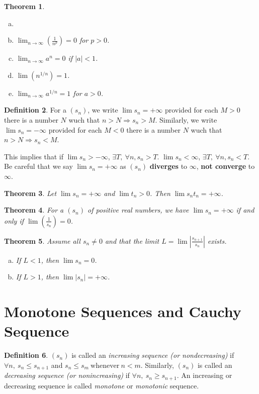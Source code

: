 \documentclass[12pt, lettersize]{book}
\theoremstyle{plain}
\newtheorem{thm}{Theorem}[section]
\theoremstyle{definition}
\newtheorem{dfn}[thm]{Definition}
\theoremstyle{remark}
\begin{document}
	\begin{thm}
		\begin{enumerate}[(a)]
			\item[]
			\item $\lim_{n\rightarrow\infty}(\frac{1}{n^p})=0$ for $p>0$.
			\item $\lim_{n\rightarrow\infty}a^n=0$ if $|a|<1$.
			\item $\lim(n^{1/n})=1$.
			\item $\lim_{n\rightarrow\infty}a^{1/n}=1$ for $a>0$.
		\end{enumerate}
	\end{thm}
	\newpage
	
	\begin{dfn}
		For a $(s_n)$, we write $\lim s_n=+\infty$ provided for each $M>0$ there is a number $N$ wuch that $n>N\Rightarrow s_n>M$. Similarly, we write $\lim s_n=-\infty$ provided for each $M<0$ there is a number $N$ wuch that $n>N\Rightarrow s_n<M$.
	\end{dfn}
	This implies that if $\lim s_n>-\infty$, $\exists T,\ \forall n, s_n>T$. $\lim s_n<\infty$, $\exists T,\ \forall n, s_n<T$. 
	Be careful that we say $\lim s_n=+\infty$ as $(s_n)$ \textbf{diverges} to $\infty$, \textbf{not converge} to $\infty$.
	
	\begin{thm}
		Let $\lim s_n=+\infty$ and $\lim t_n>0$. Then $\lim s_nt_n=+\infty$.
	\end{thm}
	
	\begin{thm}
		For a $(s_n)$ of \emph{positive} real numbers, we have $\lim s_n=+\infty$ if and only if $\lim(\frac{1}{s_n})=0$.
	\end{thm}
	
	\begin{thm}
		Assume all $s_n\neq0$ and that the limit $L=\lim\left|\frac{s_{n+1}}{s_n}\right|$ exists.
		\begin{enumerate}[(a)]
			\item If $L<1$, then $\lim s_n=0$.
			\item If $L>1$, then $\lim |s_n|=+\infty$.
		\end{enumerate} 
	\end{thm}
	
	\newpage
	\section{Monotone Sequences and Cauchy Sequence}
	\begin{dfn}
		$(s_n)$ is called an \emph{increasing sequence (or nondecreasing)} if $\forall n,\ s_n\leq s_{n+1}$ and $s_n\leq s_m\ \text{whenever}\ n<m$.
		Similarly, $(s_n)$ is called an \emph{decreasing sequence (or nonincreasing)} if $\forall n,\ s_n\geq s_{n+1}$. An increasing or decreasing sequence is called \emph{monotone} or \emph{monotonic} sequence.
	\end{dfn}
	
\end{document}
